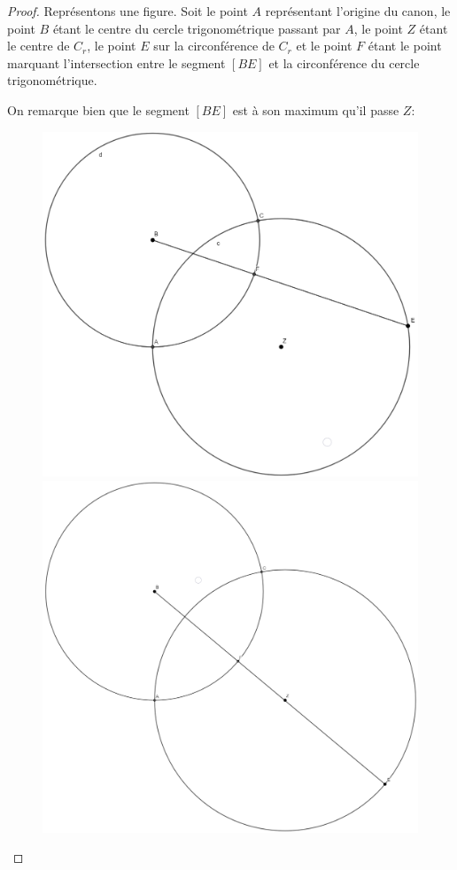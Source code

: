 \documentclass[a4paper]{amsart}
\theoremstyle{definition}
\theoremstyle{remark}
\numberwithin{equation}{section}
\begin{document}
\begin{proof}
  Représentons une figure. Soit le point $A$ représentant l'origine du canon, le point $B$ étant le centre du cercle trigonométrique passant par $A$, le point $Z$ étant le centre de $C_r$, le point
  $E$ sur la circonférence de $C_r$ et le point $F$ étant le point marquant l'intersection entre le segment $[BE]$ et la circonférence du cercle trigonométrique.

  On remarque bien que le segment $[BE]$ est à son maximum qu'il passe $Z$:

  \begin{figure}[H]
    \centering
    \includegraphics[scale=0.171,valign=t]{images/visual_proof_2.png}
    \includegraphics[scale=0.122,valign=t]{images/visual_proof.png}

\end{figure}
\end{proof}
\end{document}
